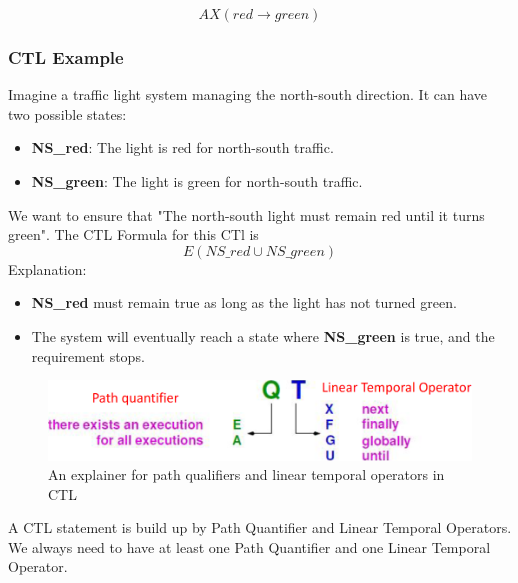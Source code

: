 \begin{equation*}
    AX (red \rightarrow green)
\end{equation*}

\subsubsection{CTL Example}
Imagine a traffic light system managing the north-south direction. It can have two possible states:
\begin{itemize}
    \item \textbf{NS\_red}: The light is red for north-south traffic.
    \item \textbf{NS\_green}: The light is green for north-south traffic.
\end{itemize}
We want to ensure that "The north-south light must remain red until it turns green".
The CTL Formula for this CTl is
\begin{equation*}
    E (NS\_red \cup NS\_green)
\end{equation*}
Explanation:
\begin{itemize}
    \item \textbf{NS\_red} must remain true as long as the light has not turned green. 
    \item The system will eventually reach a state where \textbf{NS\_green} is true, and the requirement stops.
\end{itemize}



\begin{figure}[hbt]
    \centering
    \caption{An explainer for path qualifiers and linear temporal operators in CTL}
    \label{fig:ctl-pq_and_lto_cheatsheet}
    \includegraphics[width=1\linewidth]{images/ctl-notatio_explainer.png}
\end{figure}

A CTL statement is build up by Path Quantifier and Linear Temporal Operators. We always need to have at least one Path Quantifier and one Linear Temporal Operator. 


